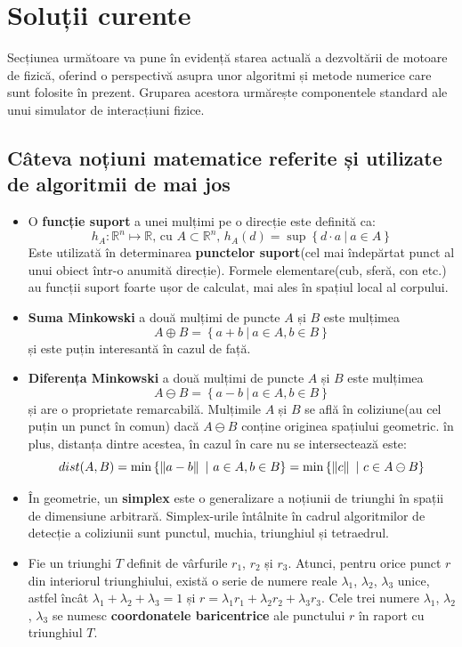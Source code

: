 \documentclass[12pt,a4paper]{report}
\begin{document}
\section{Soluții curente}
Secțiunea următoare va pune în evidență starea actuală a dezvoltării de motoare de fizică, oferind o perspectivă asupra unor algoritmi și metode numerice care sunt folosite în prezent. Gruparea acestora urmărește componentele standard ale unui simulator de interacțiuni fizice.
\subsection{Câteva noțiuni matematice referite și utilizate de algoritmii de mai jos}
\begin{itemize}
	\item O \textbf{funcție suport} a unei mulțimi pe o direcție este definită ca:
	$$ h_A:\mathbb{R}^{n} \mapsto \mathbb{R} \textrm{, cu }A \subset \mathbb{R}^{n}\textrm{,  } h_A(d) = \sup \left\lbrace d\cdot a\ |\ a\in A\right\rbrace $$
	Este utilizată în determinarea \textbf{punctelor suport}(cel mai îndepărtat punct al unui obiect într-o anumită direcție). Formele elementare(cub, sferă, con etc.) au funcții suport foarte ușor de calculat, mai ales în spațiul local al corpului.
	\label{support_points}
	\item \textbf{Suma Minkowski} a două mulțimi de puncte $A$ și $B$ este mulțimea
	$$ A \oplus B = \left\lbrace a + b\ |\ a \in A, b \in B \right\rbrace $$
	și este puțin interesantă în cazul de față.
	\item \textbf{Diferența Minkowski} a două mulțimi de puncte $A$ și $B$ este mulțimea
	$$ A \ominus B = \left\lbrace a - b\ |\ a \in A, b \in B \right\rbrace $$
	și are o proprietate remarcabilă. Mulțimile $A$ și $B$ se află în coliziune(au cel puțin un punct în comun) dacă $A \ominus B$ conține originea spațiului geometric. în plus, distanța dintre acestea, în cazul în care nu se intersectează este:
	$$ \centering dist(A, B) = \min \left\lbrace \left\Vert a - b \right\Vert\ |\ a \in A, b \in B \right\rbrace = \min \left\lbrace \left\Vert c \right\Vert\ |\ c \in A \ominus B \right\rbrace $$
	\label{minkowski_difference}
	\item În geometrie, un \textbf{simplex} este o generalizare a noțiunii de triunghi în spații de dimensiune arbitrară. Simplex-urile întâlnite în cadrul algoritmilor de detecție a coliziunii sunt punctul, muchia, triunghiul și tetraedrul.
	\label{simplex}
	\item Fie un triunghi $T$ definit de vârfurile $r_1$, $r_2$ și $r_3$. Atunci, pentru orice punct $r$ din interiorul triunghiului, există o serie de numere reale $\lambda_1$, $\lambda_2$, $\lambda_3$ unice, astfel încât $\lambda_1 + \lambda_2 + \lambda_3 = 1$ și $r = \lambda_1 r_1 + \lambda_2 r_2 + \lambda_3 r_3$. Cele trei numere $\lambda_1$, $\lambda_2$, $\lambda_3$ se numesc \textbf{coordonatele baricentrice} ale punctului $r$ în raport cu triunghiul $T$.

\end{itemize}
\end{document}
